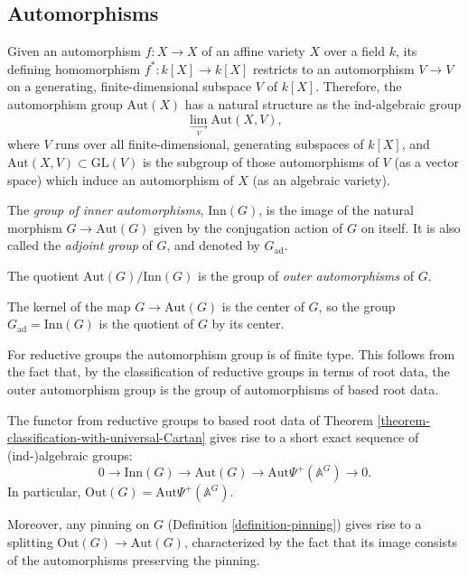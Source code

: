 \subsection{Automorphisms} 
\label{subsection-automorphisms}

Given an automorphism $f:X\to X$ of an affine variety $X$ over a field $k$, its defining homomorphism $f^*:k[X]\to k[X]$ restricts to an automorphism $V\to V$ on a generating, finite-dimensional subspace $V$ of $k[X]$. Therefore, the automorphism group $\text{Aut}(X)$ has a natural structure as the ind-algebraic group
$$ \underset{\underset{V}\to}\lim \text{Aut}(X,V),$$
where $V$ runs over all finite-dimensional, generating subspaces of $k[X]$, and $\text{Aut}(X,V)\subset \text{GL}(V)$ is the subgroup of those automorphisms of $V$ (as a vector space) which induce an automorphism of $X$ (as an algebraic variety).


\begin{definition}
 \label{definition-automorphism-group}
The {\it group of inner automorphisms}, $\text{Inn}(G)$, is the image of the natural morphism $G\to \text{Aut}(G)$ given by the conjugation action of $G$ on itself. It is also called the {\it adjoint group} of $G$, and denoted by $G_{\text{ad}}$. 

The quotient $\text{Aut}(G)/\text{Inn}(G)$ is the group of {\it outer automorphisms} of $G$.
\end{definition}

The kernel of the map $G\to \text{Aut}(G)$ is the center of $G$, so the group $G_{\text{ad}}=\text{Inn}(G)$ is the quotient of $G$ by its center.

For reductive groups the automorphism group is of finite type. This follows from the fact that, by the classification of reductive groups in terms of root data, the outer automorphism group is the group of automorphisms of based root data.

\begin{proposition}
 \label{proposition-automorphism-sequence}
The functor from reductive groups to based root data of Theorem \ref{theorem-classification-with-universal-Cartan} gives rise to a short exact sequence of (ind-)algebraic groups:
\begin{equation}
 \label{equation-Inn-Aut-Out}
0\to \text{Inn}(G)\to \text{Aut}(G)\to \text{Aut}\Psi^+(\mathbb A^G) \to 0.
\end{equation}
In particular, $\text{Out}(G)=\text{Aut}\Psi^+(\mathbb A^G) $. 

Moreover, any pinning on $G$ (Definition \ref{definition-pinning}) gives rise to a splitting $\text{Out}(G)\to \text{Aut}(G)$, characterized by the fact that its image consists of the automorphisms preserving the pinning.
\end{proposition}

